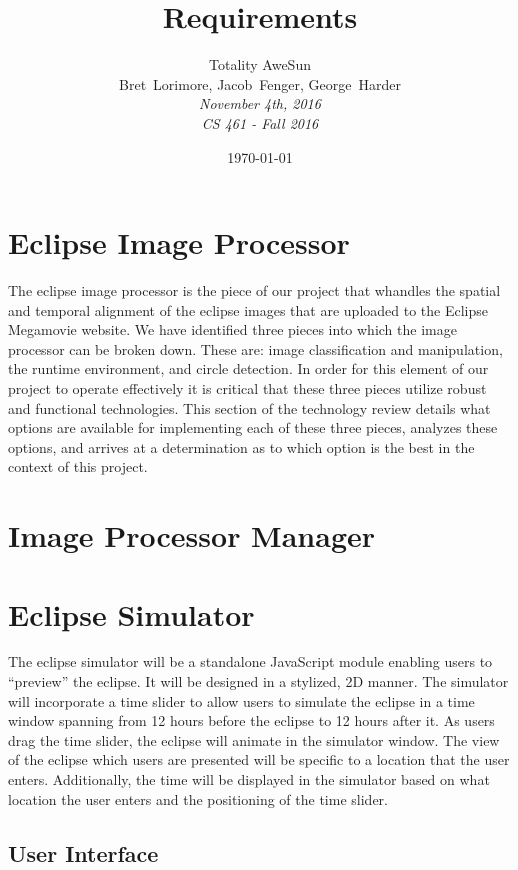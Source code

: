 \documentclass[10pt, onecolumn, draftclsnofoot, letterpaper, compsoc]{IEEEtran}
\title{Requirements}
\date{\today} %
\author{Totality AweSun \\
		Bret~Lorimore, Jacob~Fenger, George~Harder \\
		\textit{November 4th, 2016 \\
		CS 461 - Fall 2016}}
\begin{document}

\maketitle

\section{Eclipse Image Processor}

The eclipse image processor is the piece of our project that whandles the spatial
and temporal alignment of the eclipse images that are uploaded to the Eclipse
Megamovie website. We have identified three pieces\cite{imgKrista} into which
the image processor can be broken down. These are: image classification and
manipulation, the runtime environment, and circle detection. In order for this
element of our project to operate effectively it is critical that these three
pieces utilize robust and functional technologies. This section of the
technology review details what options are available for implementing each of
these three pieces, analyzes these options, and arrives at a determination as to
which option is the best in the context of this project.

\section{Image Processor Manager}

\section{Eclipse Simulator}
The eclipse simulator will be a standalone JavaScript module enabling users to
“preview” the eclipse. It will be designed in a stylized, 2D manner.
The simulator will incorporate a time slider to allow users to simulate
the eclipse in a time window spanning from 12 hours before the eclipse to 12
hours after it. As users drag the time slider, the eclipse will animate in the
simulator window. The view of the eclipse which users are presented will be
specific to a location that the user enters. Additionally, the time will be
displayed in the simulator based on what location the user enters and the
positioning of the time slider.

\subsection{User Interface}
\end{document}
